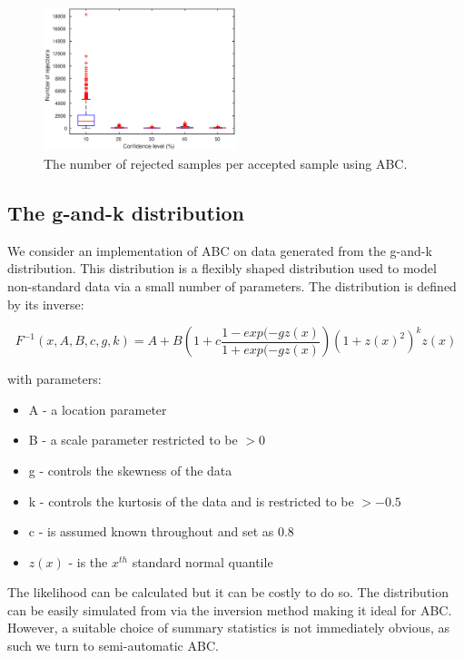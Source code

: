 \documentclass[a4paper,10pt]{article}
\begin{document}
\begin{figure}[h]
\centering
\includegraphics[width=0.5\textwidth]{rejections.eps}
\caption{The number of rejected samples per accepted sample using ABC.}
\label{rejections}
\end{figure}








\subsection{The g-and-k distribution}
We consider an implementation of ABC on data generated from the g-and-k distribution. This distribution is a flexibly shaped distribution used to model non-standard data via a small number of parameters. The distribution is defined by its inverse:

\begin{equation}
F^{-1}(x, A, B, c, g, k) = A + B\left(1 + c\frac{1-exp(-gz(x)}{1+exp(-gz(x)}\right)(1+z(x)^2)^kz(x)
\end{equation}

with parameters:
\begin{itemize}
\item A - a location parameter
\item B - a scale parameter restricted to be $>0$
\item g - controls the skewness of the data
\item k - controls the kurtosis of the data and is restricted to be $> - 0.5$
\item c - is assumed known throughout and set as 0.8
\item $z(x)$ - is the $x^{th}$ standard normal quantile
\end{itemize}

The likelihood can be calculated but it can be costly to do so. The distribution can be easily simulated from via the inversion method making it ideal for ABC. However, a suitable choice of summary statistics is not immediately obvious, as such we turn to semi-automatic ABC.
\end{document}

